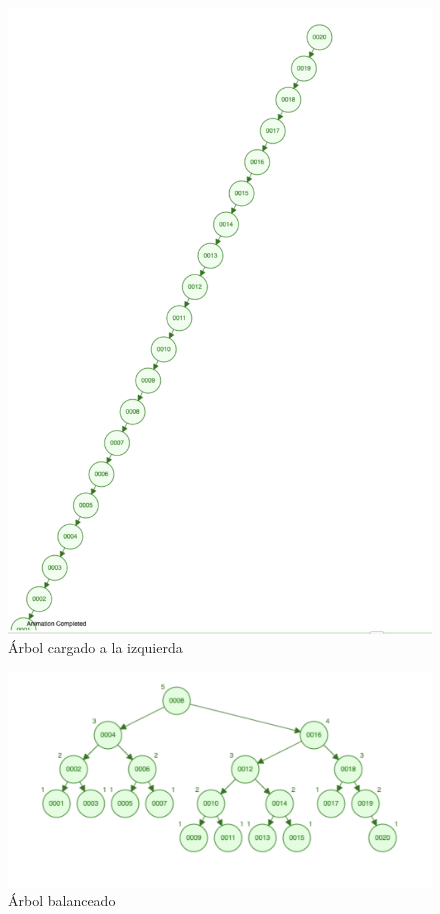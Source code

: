 \documentclass[a4paper,12pt]{article}
\begin{document}
\center
\begin{figure}[h]
\includegraphics[scale=.5]{arbol1}
\caption{Árbol cargado a la izquierda}
\end{figure}

\center
\begin{figure}[h]
\includegraphics[scale=.5]{arbol2}
\caption{Árbol balanceado}
\end{figure}
\end{document}
